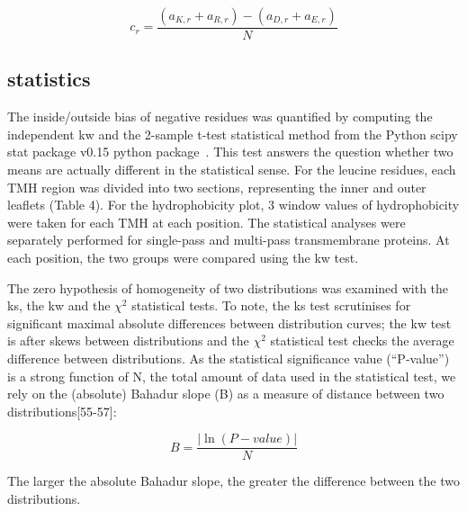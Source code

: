 \begin{equation}
c_r=\frac{(a_{K,r}+a_{R,r})-(a_{D,r}+a_{E,r})}{N}
\end{equation}

\subsection{statistics}

The inside/outside bias of negative residues was quantified by computing the independent \gls{kw} and the 2-sample t-test statistical method from the Python scipy stat package v0.15 python package~\cite{VanderWalt2011}. This test answers the question whether two means are actually different in the statistical sense. For the leucine residues, each TMH region was divided into two sections, representing the inner and outer leaflets (Table 4).  For the hydrophobicity plot, 3 window values of hydrophobicity were taken for each TMH at each position. The statistical analyses were separately performed for single-pass and multi-pass transmembrane proteins. At each position, the two groups were compared using the \gls{kw} test.

The zero hypothesis of homogeneity of two distributions was examined with the \gls{ks}, the \gls{kw} and the \({\chi}^{2}\) statistical tests. To note, the \gls{ks} test scrutinises for significant maximal absolute differences between distribution curves; the \gls{kw} test is after skews between distributions and the \({\chi}^{2}\) statistical test checks the average difference between distributions. As the statistical significance value (“P‑value”) is a strong function of N, the total amount of data used in the statistical test, we rely on the (absolute) Bahadur slope (B) as a measure of distance between two distributions[55-57]:

\begin{equation}
B=\frac{|\ln(P-value)|}{N}
\end{equation}

The larger the absolute Bahadur slope, the greater the difference between the two distributions.
